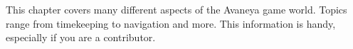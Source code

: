 

This chapter covers many different aspects of the Avaneya game world. Topics range from timekeeping to navigation and more. This information is handy, especially if you are a contributor.

%
%
%
%
%
%
%
%
%
%
%
%
%
%

%

\StopChapter

